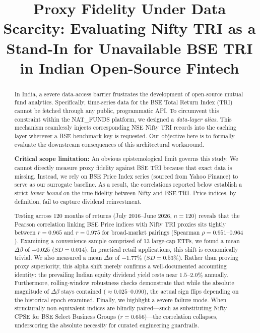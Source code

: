 \documentclass[conference]{IEEEtran}
\begin{document}
\title{Proxy Fidelity Under Data Scarcity: Evaluating Nifty TRI as a Stand-In for Unavailable BSE TRI in Indian Open-Source Fintech}

\author{
\and
{}
}

\maketitle

\begin{abstract}
In India, a severe data-access barrier frustrates the development of open-source mutual fund analytics. Specifically, time-series data for the BSE Total Return Index (TRI) cannot be fetched through any public, programmatic API. To circumvent this constraint within the NAT\_FUNDS platform, we designed a \emph{data-layer alias}. This mechanism seamlessly injects corresponding NSE Nifty TRI records into the caching layer wherever a BSE benchmark key is requested. Our objective here is to formally evaluate the downstream consequences of this architectural workaround.

\textbf{Critical scope limitation:} An obvious epistemological limit governs this study. We cannot directly measure proxy fidelity against BSE TRI because that exact data is missing. Instead, we rely on BSE Price Index series (sourced from Yahoo Finance) to serve as our surrogate baseline. As a result, the correlations reported below establish a strict \emph{lower bound} on the true fidelity between Nifty and BSE TRI. Price indices, by definition, fail to capture dividend reinvestment.

Testing across 120 months of returns (July 2016--June 2026, $n=120$) reveals that the Pearson correlation linking BSE Price indices with Nifty TRI proxies sits tightly between $r=0.965$ and $r=0.975$ for broad-market pairings (Spearman $\rho=0.951$--$0.964$). Examining a convenience sample comprised of 13 large-cap ETFs, we found a mean $\Delta\beta$ of $+0.025$ ($SD=0.014$). In practical retail applications, this shift is economically trivial. We also measured a mean $\Delta\alpha$ of $-1.77\%$ ($SD=0.53\%$). Rather than proving proxy superiority, this alpha shift merely confirms a well-documented accounting identity: the prevailing Indian equity dividend yield rests near $1.5$--$2.0\%$ annually. Furthermore, rolling-window robustness checks demonstrate that while the absolute magnitude of $\Delta\beta$ stays contained ($\approx0.025$--$0.090$), the actual sign flips depending on the historical epoch examined. Finally, we highlight a severe failure mode. When structurally non-equivalent indices are blindly paired---such as substituting Nifty CPSE for BSE Select Business Groups ($r=0.656$)---the correlation collapses, underscoring the absolute necessity for curated engineering guardrails.
\end{abstract}
\end{document}
